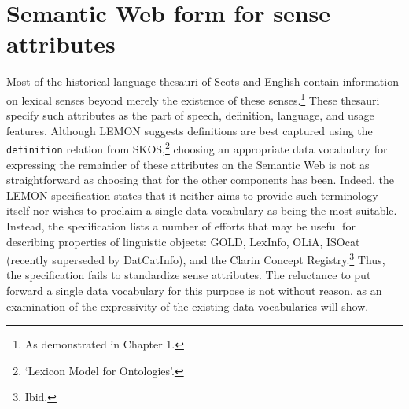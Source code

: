 \section{Semantic Web form for sense attributes}
\label{sect:Stolk_thes-digital-form:semweb-sense-attr}
Most of the historical language thesauri of Scots and English contain information on lexical senses beyond merely the existence of these senses.\footnote{As demonstrated in Chapter 1.} These thesauri specify such attributes as the part of speech, definition, language, and usage features. Although LEMON suggests definitions are best captured using the \texttt{definition} relation from SKOS,\footnote{`Lexicon Model for Ontologies'.} choosing an appropriate data vocabulary for expressing the remainder of these attributes on the Semantic Web is not as straightforward as choosing that for the other components has been. Indeed, the LEMON specification states that it neither aims to provide such terminology itself nor wishes to proclaim a single data vocabulary as being the most suitable. Instead, the specification lists a number of efforts that may be useful for describing properties of linguistic objects: GOLD, LexInfo, OLiA, ISOcat (recently superseded by DatCatInfo), and the Clarin Concept Registry.\footnote{Ibid.} %
Thus, the specification fails to standardize sense attributes. The reluctance to put forward a single data vocabulary for this purpose is not without reason, as an examination of the expressivity of the existing data vocabularies will show.

